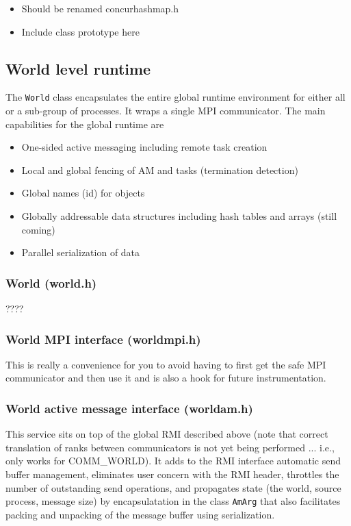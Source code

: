 \documentclass[letterpaper]{article}
\newcommand\liststyleLv{%
\renewcommand\labelitemi{${\bullet}$}
\renewcommand\labelitemii{${\circ}$}
\renewcommand\labelitemiii{${\blacksquare}$}
\renewcommand\labelitemiv{${\bullet}$}
}
\newcommand\liststyleLvi{%
\renewcommand\labelitemi{${\bullet}$}
\renewcommand\labelitemii{${\circ}$}
\renewcommand\labelitemiii{${\blacksquare}$}
\renewcommand\labelitemiv{${\bullet}$}
}
\begin{document}
\liststyleLv
\begin{itemize}
\item Should be renamed concurhashmap.h
\item Include class prototype here
\end{itemize}

\bigskip

\subsection{World level runtime}
The \texttt{World} class encapsulates the entire global runtime environment for either all or a sub-group of processes.
It wraps a single MPI communicator. The main capabilities for the global runtime are

\liststyleLvi
\begin{itemize}
\item One-sided active messaging including remote task creation
\item Local and global fencing of AM and tasks (termination detection)
\item Global names (id) for objects
\item Globally addressable data structures including hash tables and arrays (still coming)
\item Parallel serialization of data 
\end{itemize}

\bigskip

\subsubsection{World (world.h)}
????

\subsubsection{World MPI interface (worldmpi.h)}
This is really a convenience for you to avoid having to first get the safe MPI communicator and then use it and is also
a hook for future instrumentation.

\subsubsection[World active message interface (worldam.h)]{World active message interface (worldam.h)}
This service sits on top of the global RMI described above (note that correct translation of ranks between communicators
is not yet being performed ... i.e., only works for COMM\_WORLD). It adds to the RMI interface automatic send buffer
management, eliminates user concern with the RMI header, throttles the number of outstanding send operations, and
propagates state (the world, source process, message size) by encapsulatation in the class \texttt{AmArg} that also
facilitates packing and unpacking of the message buffer using serialization.
\end{document}
